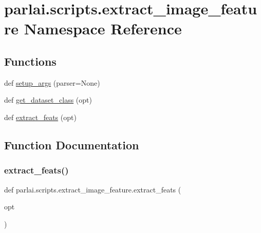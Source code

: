 \hypertarget{namespaceparlai_1_1scripts_1_1extract__image__feature}{}\section{parlai.\+scripts.\+extract\+\_\+image\+\_\+feature Namespace Reference}
\label{namespaceparlai_1_1scripts_1_1extract__image__feature}
\subsection*{Functions}
\begin{DoxyCompactItemize}
\item 
def \hyperlink{namespaceparlai_1_1scripts_1_1extract__image__feature_ab634fcc65758e30deaf92980edcc20bd}{setup\+\_\+args} (parser=None)
\item 
def \hyperlink{namespaceparlai_1_1scripts_1_1extract__image__feature_a4fa5d8aef45056034f4898531a0f9967}{get\+\_\+dataset\+\_\+class} (opt)
\item 
def \hyperlink{namespaceparlai_1_1scripts_1_1extract__image__feature_a6e3b12d361756ec79fbd44abd185387b}{extract\+\_\+feats} (opt)
\end{DoxyCompactItemize}


\subsection{Function Documentation}
\mbox{\label{namespaceparlai_1_1scripts_1_1extract__image__feature_a6e3b12d361756ec79fbd44abd185387b}} 
\subsubsection{\texorpdfstring{extract\+\_\+feats()}{extract\_feats()}}
{\footnotesize\ttfamily def parlai.\+scripts.\+extract\+\_\+image\+\_\+feature.\+extract\+\_\+feats (\begin{DoxyParamCaption}\item[{}]{opt }\end{DoxyParamCaption})}

